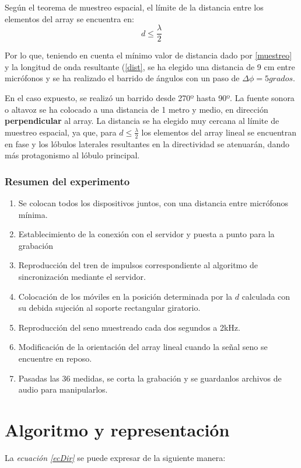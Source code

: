 \documentclass[a4paper,11pt]{book}
\begin{document}
Según el teorema de muestreo espacial, el límite de la distancia entre los elementos del array se encuentra en:
\begin{equation}
d \leq \frac{\lambda}{2}
\label{muestreo}
\end{equation}

Por lo que, teniendo en cuenta el mínimo valor de distancia dado por \ref{muestreo} y la longitud de onda resultante (\ref{dist}, se ha elegido una distancia de 9 cm entre micrófonos y se ha realizado el barrido de ángulos con un paso de $\Delta\phi = 5 grados$.

 En el caso expuesto, se realizó un barrido desde 270º hasta 90º. La fuente sonora o altavoz se ha colocado a una distancia de 1 metro y medio, en dirección \textbf{perpendicular} al array.
 La distancia se ha elegido muy cercana al límite de muestreo espacial, ya que, para $d \leq \frac{\lambda}{2}$ los elementos del array lineal se encuentran en fase y los lóbulos laterales resultantes en la directividad se atenuarán, dando más protagonismo al lóbulo principal.

\subsubsection{Resumen del experimento}
\begin{enumerate}
\item Se colocan todos los dispositivos juntos, con una distancia entre micrófonos mínima.
\item Establecimiento de la conexión con el servidor y puesta a punto para la grabación
\item Reproducción del tren de impulsos correspondiente al algoritmo de sincronización mediante el servidor.
\item Colocación de los móviles en la posición determinada por la $d$ calculada con su debida sujeción al soporte rectangular giratorio.
\item Reproducción del seno muestreado cada dos segundos a 2kHz.
\item Modificación de la orientación del array lineal cuando la señal seno se encuentre en reposo.
\item Pasadas las 36 medidas, se corta la grabación y se guardanlos archivos de audio para manipularlos. 
\end{enumerate}


\section{Algoritmo y representación}
La \textit{ecuación \ref{ecDir}} se puede expresar de la siguiente manera:
\end{document}
